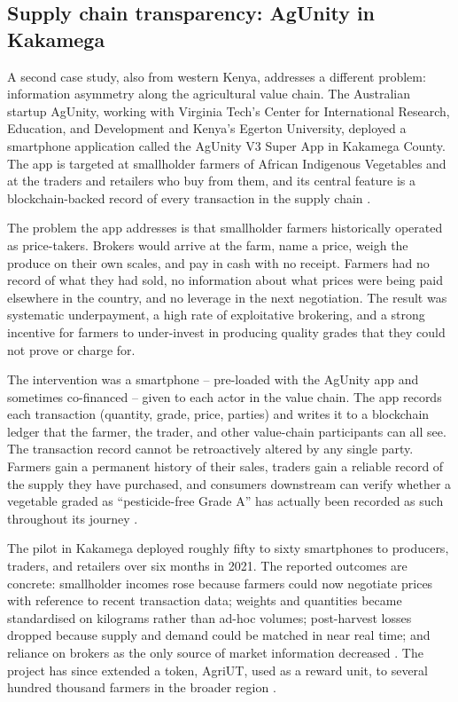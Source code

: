 \subsection{Supply chain transparency: AgUnity in Kakamega}

A second case study, also from western Kenya, addresses a different
problem: information asymmetry along the agricultural value chain. The
Australian startup AgUnity, working with Virginia Tech's Center for
International Research, Education, and Development and Kenya's Egerton
University, deployed a smartphone application called the AgUnity V3 Super
App in Kakamega County. The app is targeted at smallholder farmers of
African Indigenous Vegetables and at the traders and retailers who buy
from them, and its central feature is a blockchain-backed record of every
transaction in the supply chain
\cite{agunityAIV2022,disruptionAgUnity2022}.

The problem the app addresses is that smallholder farmers historically
operated as price-takers. Brokers would arrive at the farm, name a price,
weigh the produce on their own scales, and pay in cash with no receipt.
Farmers had no record of what they had sold, no information about what
prices were being paid elsewhere in the country, and no leverage in the
next negotiation. The result was systematic underpayment, a high rate of
exploitative brokering, and a strong incentive for farmers to under-invest
in producing quality grades that they could not prove or charge for.

The intervention was a smartphone -- pre-loaded with the AgUnity app and
sometimes co-financed -- given to each actor in the value chain. The app
records each transaction (quantity, grade, price, parties) and writes it
to a blockchain ledger that the farmer, the trader, and other value-chain
participants can all see. The transaction record cannot be retroactively
altered by any single party. Farmers gain a permanent history of their
sales, traders gain a reliable record of the supply they have purchased,
and consumers downstream can verify whether a vegetable graded as
``pesticide-free Grade A'' has actually been recorded as such throughout
its journey \cite{disruptionAgUnity2022}.

The pilot in Kakamega deployed roughly fifty to sixty smartphones to
producers, traders, and retailers over six months in 2021. The reported
outcomes are concrete: smallholder incomes rose because farmers could now
negotiate prices with reference to recent transaction data; weights and
quantities became standardised on kilograms rather than ad-hoc volumes;
post-harvest losses dropped because supply and demand could be matched in
near real time; and reliance on brokers as the only source of market
information decreased \cite{agunityAIV2022,disruptionAgUnity2022}. The
project has since extended a token, AgriUT, used as a reward unit, to
several hundred thousand farmers in the broader region
\cite{disruptionAgUnity2022}.

